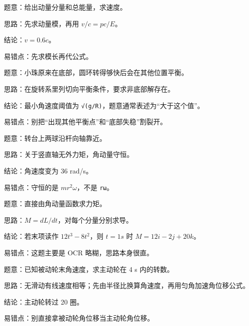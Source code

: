 \documentclass[12pt,a4paper]{ctexart}
\begin{document}
\begin{tcolorbox}[colback=white,colframe=black!55,title={16. 已知三维动量和总能量，求粒子速率}]
题意：给出动量分量和总能量，求速度。\par
思路：先求动量模，再用 \(v/c=pc/E\)。\par
结论：\(v=0.6c\)。\par
易错点：先求模长再代公式。\par
\end{tcolorbox}

\begin{tcolorbox}[colback=white,colframe=black!55,title={17. 竖直圆环绕竖直直径转动时，小珠离开底部并停在别处的最小角速度}]
题意：小珠原来在底部，圆环转得够快后会在其他位置平衡。\par
思路：在旋转系里列切向平衡条件，要求非底部解存在。\par
结论：最小角速度阈值为 \texttt{√(g/R)}，题意通常表述为“大于这个值”。\par
易错点：别把“出现其他平衡点”和“底部失稳”割裂开。\par
\end{tcolorbox}

\begin{tcolorbox}[colback=white,colframe=black!55,title={18. 两钢球缩短到轴的距离后角速度变多少}]
题意：转台上两球沿杆向轴靠近。\par
思路：关于竖直轴无外力矩，角动量守恒。\par
结论：角速度变为 36 rad/s。\par
易错点：守恒的是 \(mr^2ω\)，不是 \texttt{rω}。\par
\end{tcolorbox}

\begin{tcolorbox}[colback=white,colframe=black!55,title={19. 已知角动量矢量随时间变化，求 \(t=1 s\) 时力矩}]
题意：直接由角动量函数求力矩。\par
思路：\(M=dL/dt\)，对每个分量分别求导。\par
结论：若末项读作 \(12t^3-8t^2\)，则 \(t=1 s\) 时 \(M=12i-2j+20k\)。\par
易错点：这题主要是 OCR 略糊，思路本身很直。\par
\end{tcolorbox}

\begin{tcolorbox}[colback=white,colframe=black!55,title={20. 皮带传动中主动轮在 4 s 内转过多少圈}]
题意：已知被动轮末角速度，求主动轮在 4 s 内的转数。\par
思路：无滑动有线速度相等；先由半径比换算角速度，再用匀角加速角位移公式。\par
结论：主动轮转过 20 圈。\par
易错点：别直接拿被动轮角位移当主动轮角位移。\par
\end{tcolorbox}
\end{document}

